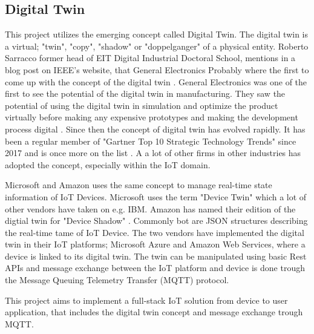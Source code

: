\subsection{Digital Twin}
This project utilizes the emerging concept called Digital Twin. The digital twin is a virtual; "twin", "copy", "shadow" or "doppelganger" of a physical entity. Roberto Sarracco former head of EIT Digital Industrial Doctoral School, mentions in a blog post on IEEE's website, that General Electronics Probably where the first to come up with the concept of the digital twin \cite{IEEE}.
General Electronics was one of the first to see the potential of the digital twin in manufacturing. They saw the potential of using the digital twin in simulation and optimize the product virtually before making any expensive prototypes and making the development process digital \cite{GE}. Since then the concept of digital twin has evolved rapidly. It has been a regular member of "Gartner Top 10 Strategic Technology Trends" since 2017 and is once more on the list \cite{Gartner}. A a lot of other firms in other industries has adopted the concept, especially within the IoT domain. 

Microsoft and Amazon uses the same concept to manage real-time state information of IoT Devices. Microsoft uses the term "Device Twin" \cite{MS} which a lot of other vendors have taken on e.g. IBM. Amazon has named their edition of the digtial twin for "Device Shadow" \cite{Amazon}. Commonly bot are JSON structures describing the real-time tame of IoT Device. The two vendors have implemented the digital twin in their IoT platforms; Microsoft Azure and Amazon Web Services, where a device is linked to its digital twin. The twin can be manipulated using basic Rest APIs and message exchange between the IoT platform and device is done trough the Message Queuing Telemetry Transfer (MQTT) protocol. 

This project aims to implement a full-stack IoT solution from device to user application, that includes the digital twin concept and message exchange trough MQTT. 